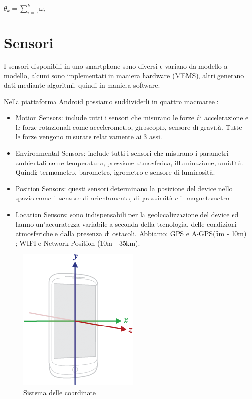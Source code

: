 \documentclass[12pt,a4paper,openright,twoside]{report}
\begin{document}
\begin{center}
$\theta_k = \sum_{i=0}^k \omega_i$
\end{center}

\section{Sensori}

I sensori disponibili in uno smartphone sono diversi e variano da modello a modello, alcuni sono implementati in maniera hardware (MEMS), altri generano dati mediante algoritmi, quindi in maniera software. 

Nella piattaforma Android possiamo suddividerli in quattro macroaree \cite{K10}:
\begin{itemize}
\item Motion Sensors: include tutti i sensori che misurano le forze di accelerazione e le forze rotazionali come accelerometro, giroscopio, sensore di gravità. Tutte le forze vengono misurate relativamente ai 3 assi.
\item Environmental Sensors: include tutti i sensori che misurano i parametri ambientali come temperatura, pressione atmosferica, illuminazione, umidità. Quindi: termometro, barometro, igrometro e sensore di luminosità.
\item Position Sensors: questi sensori determinano la posizione del device nello spazio come il sensore di orientamento, di prossimità e il magnetometro.
\item Location Sensors: sono indispensabili per la geolocalizzazione del device ed hanno un'accuratezza variabile a seconda della tecnologia, delle condizioni atmosferiche e dalla presenza di ostacoli. Abbiamo: GPS e A-GPS(5m - 10m) \cite{K11}; WIFI e Network Position (10m - 35km).
\end{itemize}

\begin{figure}[h] 
\centering 
\includegraphics[scale=0.8]{fig2} 
\caption{Sistema delle coordinate} 
\end{figure}
\end{document}
